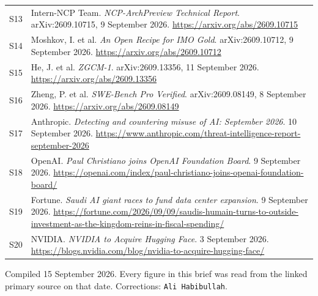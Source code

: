 \documentclass[11pt,a4paper]{article}
\newcommand{\briefdate}{15 September 2026}
\newcommand{\briefauthor}{Ali Habibullah}
\begin{document}
{\begin{tabularx}{\textwidth}{@{}l X@{}}
S13 & Intern-NCP Team. \emph{NCP-ArchPreview Technical Report}. arXiv:2609.10715, 9 September 2026. \url{https://arxiv.org/abs/2609.10715} \\
S14 & Moshkov, I. et al. \emph{An Open Recipe for IMO Gold}. arXiv:2609.10712, 9 September 2026. \url{https://arxiv.org/abs/2609.10712} \\
S15 & He, J. et al. \emph{ZGCM-1}. arXiv:2609.13356, 11 September 2026. \url{https://arxiv.org/abs/2609.13356} \\
S16 & Zheng, P. et al. \emph{SWE-Bench Pro Verified}. arXiv:2609.08149, 8 September 2026. \url{https://arxiv.org/abs/2609.08149} \\
S17 & Anthropic. \emph{Detecting and countering misuse of AI: September 2026}. 10 September 2026. \url{https://www.anthropic.com/threat-intelligence-report-september-2026} \\
S18 & OpenAI. \emph{Paul Christiano joins OpenAI Foundation Board}. 9 September 2026. \url{https://openai.com/index/paul-christiano-joins-openai-foundation-board/} \\
S19 & Fortune. \emph{Saudi AI giant races to fund data center expansion}. 9 September 2026. \url{https://fortune.com/2026/09/09/saudis-humain-turns-to-outside-investment-as-the-kingdom-reins-in-fiscal-spending/} \\
S20 & NVIDIA. \emph{NVIDIA to Acquire Hugging Face}. 3 September 2026. \url{https://blogs.nvidia.com/blog/nvidia-to-acquire-hugging-face/} \\
\bottomrule
\end{tabularx}}

\vspace{0.8em}
{\footnotesize\color{brandgrey}
Compiled \briefdate. Every figure in this brief was read from the linked primary
source on that date. Corrections: \texttt{\briefauthor}.}
\end{document}

